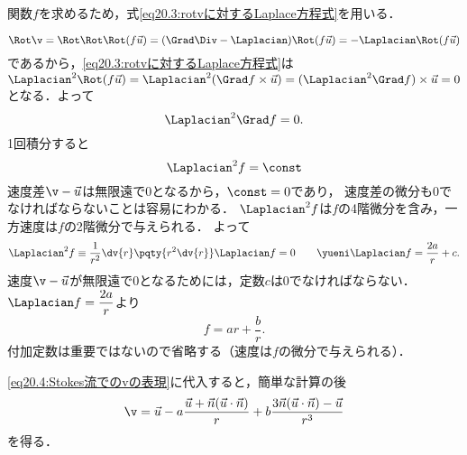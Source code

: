 関数$f$を求めるため，式\eqref{eq20.3:rotvに対するLaplace方程式}を用いる．

\[
    \Rot\v = \Rot\Rot\Rot(f\vec{u}) = (\Grad\Div-\Laplacian)\Rot(f\vec{u})
    = -\Laplacian\Rot(f\vec{u})
\]
であるから，\eqref{eq20.3:rotvに対するLaplace方程式}は
$\Laplacian^2\Rot(f\vec{u}) = \Laplacian^2(\Grad f\times \vec{u}) = (\Laplacian^2 \Grad f) \times\vec{u} = 0$
となる．よって
\begin{equation}
    \Laplacian^2 \Grad f = 0 .
\end{equation}
1回積分すると
\[
    \Laplacian^2f = \const 
\]
速度差$\v-\vec{u}$は無限遠で0となるから，$\const=0$であり，
速度差の微分も0でなければならないことは容易にわかる．
$\Laplacian^2f$は$f$の4階微分を含み，一方速度は$f$の2階微分で与えられる．
よって
\[
    \Laplacian^2f \equiv \frac{1}{r^2} \dv{r} \pqty{r^2 \dv{r}} \Laplacian f = 0
    \qquad\yueni \Laplacian f = \frac{2a}{r}+c .
\]
速度$\v-\vec{u}$が無限遠で0となるためには，定数$c$は0でなければならない．
$\Laplacian f = \dfrac{2a}{r}$より
\begin{equation}
    f = ar + \frac{b}{r} .
\end{equation}
付加定数は重要ではないので省略する（速度は$f$の微分で与えられる）．


\eqref{eq20.4:Stokes流でのvの表現}に代入すると，簡単な計算の後
\begin{equation}\label{a,bで表したStokes流の速度}
    \v = \vec{u} -a \frac{\vec{u}+\vec{n}(\vec{u}\cdot\vec{n})}{r} +b \frac{3\vec{n}(\vec{u}\cdot\vec{n})-\vec{u}}{r^3}
\end{equation}
を得る．


